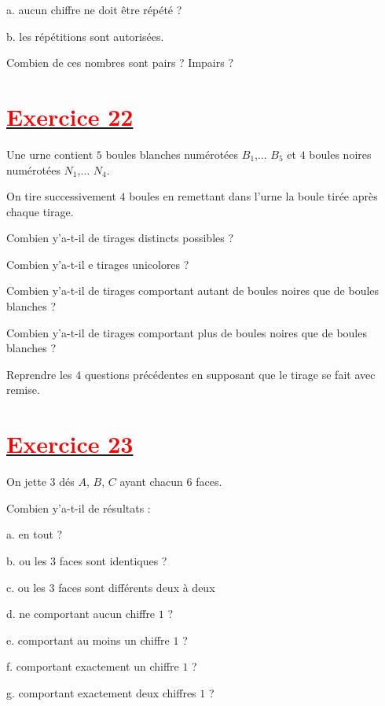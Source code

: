 \documentclass[12pt]{article}
\begin{document}
a. aucun chiffre ne doit être répété ?

b. les répétitions sont autorisées.

Combien de ces nombres sont pairs ? Impairs ?
\section*{\underline{\textbf{\textcolor{red}{Exercice 22}}}}
Une urne contient $5$ boules blanches numérotées $B_{1}$,$\ldots$ $B_{5}$ et $4$ boules noires numérotées $N_{1}$,$\ldots$ $N_{4}.$

On tire successivement $4$ boules en remettant dans l'urne la boule tirée après chaque tirage.

Combien y'a-t-il de tirages distincts possibles ? 

Combien y’a-t-il e tirages unicolores ?

Combien y’a-t-il de tirages comportant autant de boules noires que de boules blanches ?

Combien y’a-t-il de tirages comportant plus de boules noires que de boules blanches ?

Reprendre les $4$ questions précédentes en supposant que le tirage se fait avec remise.
\section*{\underline{\textbf{\textcolor{red}{Exercice 23}}}}
On jette $3$ dés $A$, $B$, $C$ ayant chacun $6$ faces.
	
Combien y’a-t-il de résultats :
	
a. en tout ?
	
b. ou les $3$ faces sont identiques ?
	
c. ou les $3$ faces sont différents deux à deux
	
d. ne comportant aucun chiffre $1$ ?
	
e. comportant au moins un chiffre $1$ ?
	
f. comportant exactement un chiffre $1$ ?
	
g. comportant exactement deux chiffres $1$ ?
\end{document}
